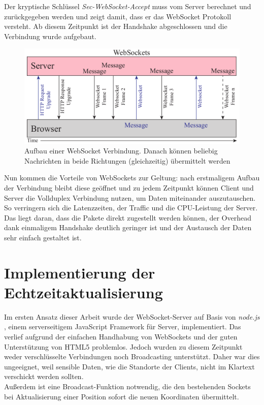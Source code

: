 Der kryptische Schlüssel \emph{Sec-WebSocket-Accept} muss vom Server berechnet und zurückgegeben werden und zeigt damit, dass er das WebSocket Protokoll versteht. Ab diesem Zeitpunkt ist der Handshake abgeschlossen und die Verbindung wurde aufgebaut.\par

\begin{figure}[!ht]
	\centering
	\includegraphics[width=15cm]{fig/websockets}
	\caption[Aufbau einer WebSocket Verbindung]{Aufbau einer WebSocket Verbindung. Danach können beliebig Nachrichten in beide Richtungen (gleichzeitig) übermittelt werden {\cite[S. 7]{ws}}}
\end{figure}

Nun kommen die Vorteile von WebSockets zur Geltung: nach erstmaligem Aufbau der Verbindung bleibt diese geöffnet und zu jedem Zeitpunkt können Client und Server die Vollduplex Verbindung nutzen, um Daten miteinander auszutauschen. So verringern sich die Latenzzeiten, der Traffic und die CPU-Leistung der Server. Das liegt daran, dass die Pakete direkt zugestellt werden können, der Overhead dank einmaligem Handshake deutlich geringer ist und der Austausch der Daten sehr einfach gestaltet ist.

\section{Implementierung der Echtzeitaktualisierung}
Im ersten Ansatz dieser Arbeit wurde der WebSocket-Server auf Basis von \emph{node.js} \cite{node.js}, einem serverseitigem JavaScript Framework für Server, implementiert. Das verlief aufgrund der einfachen Handhabung von WebSockets und der guten Unterstützung von HTML5 problemlos. Jedoch wurden zu diesem Zeitpunkt weder verschlüsselte Verbindungen noch Broadcasting unterstützt. Daher war dies ungeeignet, weil sensible Daten, wie die Standorte der Clients, nicht im Klartext verschickt werden sollten.\\
Außerdem ist eine Broadcast-Funktion notwendig, die den bestehenden Sockets bei Aktualisierung einer Position sofort die neuen Koordinaten übermittelt.\par

